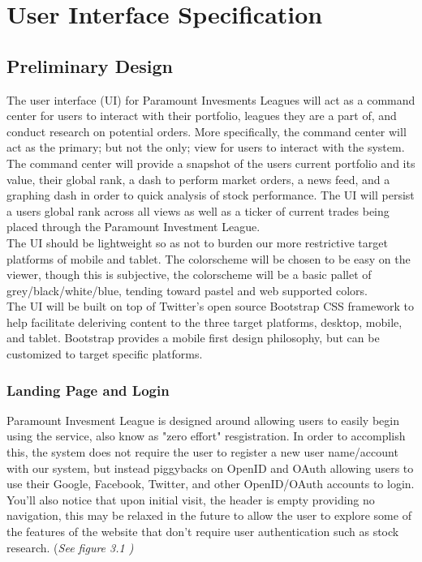 \chapter{User Interface Specification}
\label{uispec}
\section{Preliminary Design}

The user interface (UI) for Paramount Invesments Leagues will act as a command center
for users to interact with their portfolio, leagues they are a part of, and conduct
research on potential orders. More specifically, the command center will act as the
primary; but not the only; view for users to interact with the system.  The command
center will provide a snapshot of the users current portfolio and its value, their
global rank, a dash to perform market orders, a news feed, and a graphing dash in order
to quick analysis of stock performance.  The UI will persist a users global rank across
all views as well as a ticker of current trades being placed through the Paramount
Investment League.\\

The UI should be lightweight so as not to burden our more restrictive target platforms
of mobile and tablet.  The colorscheme will be chosen to be easy on the viewer, though
this is subjective, the colorscheme will be a basic pallet of grey/black/white/blue,
tending toward pastel and web supported colors.\\

The UI will be built on top of Twitter's open source Bootstrap CSS framework to help
facilitate deleriving content to the three target platforms, desktop, mobile, and tablet.
Bootstrap provides a mobile first design philosophy, but can be customized to target
specific platforms.\\

\subsection{Landing Page and Login}

Paramount Invesment League is designed around allowing users to easily begin using the
service, also know as "zero effort" resgistration. In order to accomplish this, the
system does not require the user to register a new user name/account with our system,
but instead piggybacks on OpenID and OAuth allowing users to use their Google,
Facebook, Twitter, and other OpenID/OAuth accounts to login. You'll also notice that
upon initial visit, the header is empty providing no navigation, this may be relaxed in
the future to allow the user to explore some of the features of the website that don't
require user authentication such as stock research. (\em See figure 3.1 \em)\\

